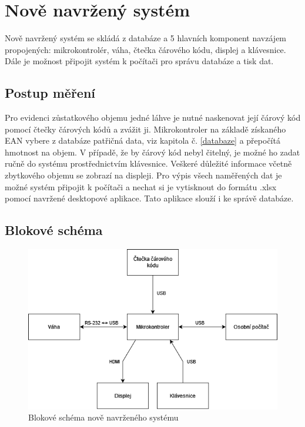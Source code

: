 \chapter{Nově navržený systém}
\label{Nově navržený systém}
Nově navržený systém se skládá z databáze a 5 hlavních komponent navzájem propojených: mikrokontrolér, váha, čtečka čárového kódu, displej a klávesnice. Dále je možnost připojit systém k počítači pro správu databáze a tisk dat. 

\section{Postup měření}%
Pro evidenci zůstatkového objemu jedné láhve je nutné naskenovat její čárový kód pomocí čtečky čárových kódů a zvážit ji. Mikrokontroler na základě získaného EAN vybere z databáze patřičná data, viz kapitola č. \ref{databaze} a přepočítá hmotnost na objem. V případě, že by čárový kód nebyl čitelný, je možné ho zadat ručně do systému prostřednictvím klávesnice. Veškeré důležité informace včetně zbytkového objemu se zobrazí na displeji. Pro výpis všech naměřených dat je možné systém připojit k počítači a nechat si je vytisknout do formátu .xlsx pomocí navržené desktopové aplikace. Tato aplikace slouží i ke správě databáze.

\section{Blokové schéma}
\begin{figure}[!h]
    \begin{center}
        \includegraphics[scale=0.7]{obrazky/Blokové schéma.png}
    \end{center}
    \label{blokove_schema}
    \caption{Blokové schéma nově navrženého systému}
\end{figure}

